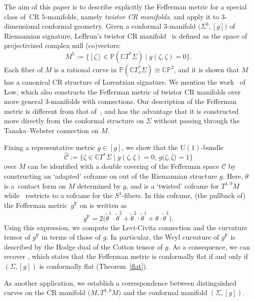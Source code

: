 \documentclass[pdftex]{sigma}
\renewcommand\th{\theta}
\newcommand\ol{\overline}
\newcommand{\wh}{\widehat}
\numberwithin{equation}{section}
\begin{document}
 The aim of this paper is to describe explicitly the Fefferman metric for a special class of~CR $5$-manifolds, namely {\it twistor CR manifolds}, and apply it to $3$-dimensional conformal geometry. Given a conformal $3$-manifold $\bigl(\Sigma^3, [g]\bigr)$ of Riemannian signature, LeBrun's twistor CR manifold~\cite{LeB} is defined as the space of projectivized complex null (co)vectors:
\[
M^5:=\{[\zeta]\in\mathbb{P}(\mathbb{C}T^*\Sigma)\mid g(\zeta, \zeta)=0 \}.
\]
Each fiber of $M$ is a rational curve in $\mathbb{P}(\mathbb{C}T_x^*\Sigma)\cong \mathbb{CP}^2$, and it is shown that $M$ has a canonical CR structure of Lorentzian signature. We mention the work~\cite{Low} of Low, which also constructs the Fefferman metric of twistor CR manifolds over more general 3-manifolds with connections. Our description of the Fefferman metric is different from that of~\cite{Low}, and has the advantage that it is constructed more directly from the conformal structure on $\Sigma$ without passing through the Tanaka--Webster connection on $M$.

Fixing a representative metric $g\in[g]$, we show that the $\mathrm{U}(1)$-bundle
\[
\wh{\mathcal{C}}:=\bigl\{\zeta\in\mathbb{C}T^*\Sigma\mid g(\zeta, \zeta)=0,\, g\bigl(\zeta, \ol\zeta\bigr)=1\bigr\}
\]
over $M$ can be identified with a double covering of the Fefferman space $\mathcal{C}$ by constructing an `adapted' coframe \smash{$\bigl(\tilde\theta^0=\theta, \tilde\theta^1, \tilde\theta^2, \tilde\theta^{\ol1}, \tilde\theta^{\ol2}, \tilde\theta^3\bigr)$} on \smash{$\wh{\mathcal{C}}$} out of the Riemannian structure $g$.
Here, $\th$ is a~contact form on $M$ determined by $g$, and \smash{$\bigl(\tilde\th^1, \tilde\th^2\bigr)$} is a `twisted' coframe for $T^{1, 0}M$ while~\smash{$\tilde\th^3$} restricts to a coframe for the $S^1$-fibers. In this coframe, (the pullback of) the Fefferman metric~$g^{\mathrm{F}}$ on \smash{$\wh{\mathcal{C}}$} is written as
\[
g^{\mathrm{F}}=2\bigl(\tilde\theta^1\cdot\tilde\theta^{\ol2}+\tilde\theta^2\cdot\tilde\theta^{\ol1}+\theta\cdot \tilde\theta^3\bigr).
\]
Using this expression, we compute the Levi-Civita connection and the curvature tensor of $g^{\mathrm{F}}$ in terms of those of $g$. In particular, the Weyl curvature of $g^{\mathrm{F}}$ is described by the Hodge dual of the Cotton tensor of $g$. As a consequence, we can recover \cite[Theorem~6.7]{Low}, which states that the Fefferman metric is conformally flat if and only if $(\Sigma, [g])$ is conformally flat (Theorem~\ref{flat}).

As another application, we establish a correspondence between distinguished curves on the CR manifold $\bigl(M, T^{1, 0}M\bigr)$ and the conformal manifold $(\Sigma, [g])$.
\end{document}
